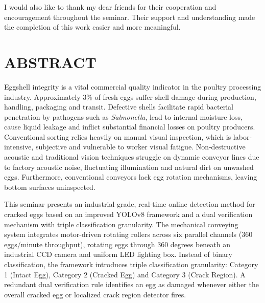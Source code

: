 \documentclass[12pt,a4paper]{report}
\begin{document}
I would also like to thank my dear friends for their cooperation and encouragement throughout the seminar. Their support and understanding made the completion of this work easier and more meaningful.

\newpage


\chapter*{ABSTRACT}


Eggshell integrity is a vital commercial quality indicator in the poultry processing industry. Approximately 3\% of fresh eggs suffer shell damage during production, handling, packaging and transit. Defective shells facilitate rapid bacterial penetration by pathogens such as \textit{Salmonella}, lead to internal moisture loss, cause liquid leakage and inflict substantial financial losses on poultry producers. Conventional sorting relies heavily on manual visual inspection, which is labor-intensive, subjective and vulnerable to worker visual fatigue. Non-destructive acoustic and traditional vision techniques struggle on dynamic conveyor lines due to factory acoustic noise, fluctuating illumination and natural dirt on unwashed eggs. Furthermore, conventional conveyors lack egg rotation mechanisms, leaving bottom surfaces uninspected.

This seminar presents an industrial-grade, real-time online detection method for cracked eggs based on an improved YOLOv8 framework and a dual verification mechanism with triple classification granularity. The mechanical conveying system integrates motor-driven rotating rollers across six parallel channels (360 eggs/minute throughput), rotating eggs through 360 degrees beneath an industrial CCD camera and uniform LED lighting box. Instead of binary classification, the framework introduces triple classification granularity: Category 1 (Intact Egg), Category 2 (Cracked Egg) and Category 3 (Crack Region). A redundant dual verification rule identifies an egg as damaged whenever either the overall cracked egg or localized crack region detector fires.
\end{document}
